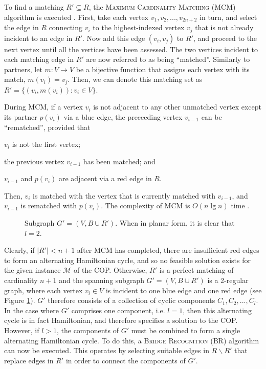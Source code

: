 \documentclass[runningheads]{llncs}
\begin{document}
To find a matching $R' \subseteq R$, the \textsc{Maximum Cardinality Matching} (MCM) algorithm is executed \cite{mahadev1994, becker2010}. First, take each vertex $v_1, v_2,..., v_{2n+2}$ in turn, and select the edge in $R$ connecting $v_i$ to the highest-indexed vertex $v_j$ that is not already incident to an edge in $R'$. Now add this edge $(v_i, v_j)$ to $R'$, and proceed to the next vertex until all the vertices have been assessed. The two vertices incident to each matching edge in $R'$ are now referred to as being ``matched''. Similarly to partners, let $m : V \to V$ be a bijective function that assigns each vertex with its match, $m(v_i) = v_j$. Then, we can denote this matching set as $R' =\{(v_i, m(v_i)) : v_i \in V\}$. 

During MCM, if a vertex $v_i$ is not adjacent to any other unmatched vertex except its partner $p(v_i)$ via a blue edge, the preceeding vertex $v_{i-1}$ can be ``rematched'', provided that 
\begin{enumerate*}[label={(\alph*)}]
	\item $v_i$ is not the first vertex; 
	\item the previous vertex $v_{i-1}$ has been matched; and
	\item $v_{i-1}$ and $p(v_i)$ are adjacent via a red edge in $R$.
\end{enumerate*}
Then, $v_i$ is matched with the vertex that is currently matched with $v_{i-1}$, and $v_{i-1}$ is rematched with $p(v_i)$. The complexity of MCM is $O(n \lg n)$ time \cite{mahadev1994}.

\begin{figure}	
	\centering
	\begin{subfigure}[h]{0.4\textwidth}
		
	\end{subfigure} \quad
	\begin{subfigure}[h]{0.56\textwidth}
		
	\end{subfigure}
	\caption{Subgraph $G'= (V, B \cup R')$. When in planar form, it is clear that $l = 2$.}
	\label{fig:mps}
\end{figure}

Clearly, if $|R'| < n+1$ after MCM has completed, there are insufficient red edges to form an alternating Hamiltonian cycle, and so no feasible solution exists for the given instance $\mathcal{M}$ of the COP. Otherwise, $R'$ is a perfect matching of cardinality $n+1$ and the spanning subgraph $G'=(V, B \cup R')$ is a 2-regular graph, where each vertex $v_i \in V$ is incident to one blue edge and one red edge (see Figure \ref{fig:mps}). $G'$ therefore consists of a collection of cyclic components $C_1, C_2, ..., C_l$. In the case where $G'$ comprises one component, i.e. $l = 1$, then this alternating cycle is in fact Hamiltonian, and therefore specifies a solution to the COP. However, if $l > 1$, the components of $G'$ must be combined to form a single alternating Hamiltonian cycle. To do this, a \textsc{Bridge Recognition} (BR) algorithm can now be executed. This operates by selecting suitable edges in $R\backslash R'$ that replace edges in $R'$ in order to connect the components of $G'$.
\end{document}
